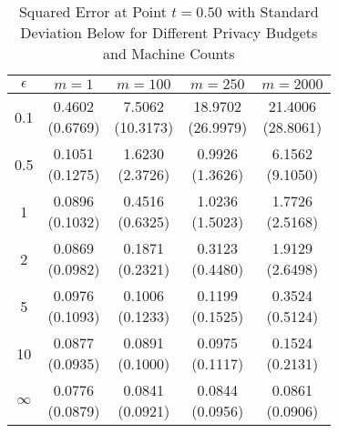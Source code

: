 \begin{table}[ht]
\centering
\begin{tabular}{ccccc}
  \toprule
$\epsilon$ & $m=1$ & $m=100$ & $m=250$ & $m=2000$ \\ 
  \midrule
0.1 & \makecell{0.4602 \\ (0.6769)} & \makecell{7.5062 \\ (10.3173)} & \makecell{18.9702 \\ (26.9979)} & \makecell{21.4006 \\ (28.8061)} \\ 
  0.5 & \makecell{0.1051 \\ (0.1275)} & \makecell{1.6230 \\ (2.3726)} & \makecell{0.9926 \\ (1.3626)} & \makecell{6.1562 \\ (9.1050)} \\ 
  1 & \makecell{0.0896 \\ (0.1032)} & \makecell{0.4516 \\ (0.6325)} & \makecell{1.0236 \\ (1.5023)} & \makecell{1.7726 \\ (2.5168)} \\ 
  2 & \makecell{0.0869 \\ (0.0982)} & \makecell{0.1871 \\ (0.2321)} & \makecell{0.3123 \\ (0.4480)} & \makecell{1.9129 \\ (2.6498)} \\ 
  5 & \makecell{0.0976 \\ (0.1093)} & \makecell{0.1006 \\ (0.1233)} & \makecell{0.1199 \\ (0.1525)} & \makecell{0.3524 \\ (0.5124)} \\ 
  10 & \makecell{0.0877 \\ (0.0935)} & \makecell{0.0891 \\ (0.1000)} & \makecell{0.0975 \\ (0.1117)} & \makecell{0.1524 \\ (0.2131)} \\ 
  $\infty$ & \makecell{0.0776 \\ (0.0879)} & \makecell{0.0841 \\ (0.0921)} & \makecell{0.0844 \\ (0.0956)} & \makecell{0.0861 \\ (0.0906)} \\ 
   \bottomrule
\end{tabular}
\caption{Squared Error at Point $t=0.50$ with Standard Deviation Below for Different Privacy Budgets and Machine Counts} 
\label{tab:mse_point}
\end{table}
